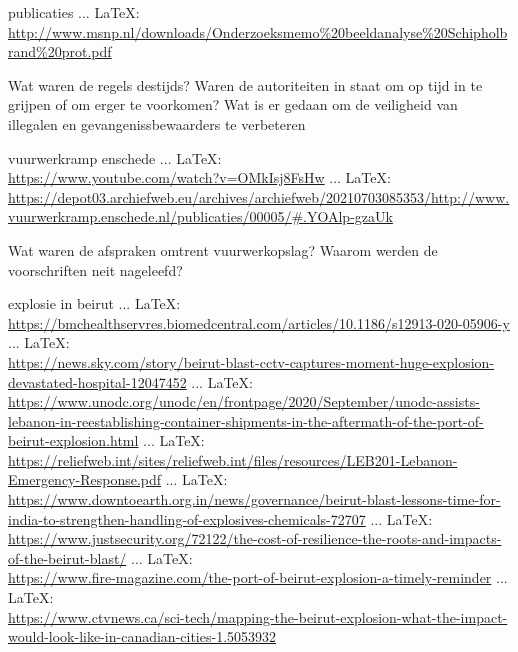 \begin{thebibliography}{99}
{{{{{{{	
	
	publicaties
	 ... \LaTeX:\\ \url{http://www.msnp.nl/downloads/Onderzoeksmemo%20beeldanalyse%20Schipholbrand%20prot.pdf}
	 
	Wat waren de regels destijds?
	Waren de autoriteiten in staat om op tijd in te grijpen of om erger te voorkomen?
	Wat is er gedaan om de veiligheid van illegalen en gevangenissbewaarders te verbeteren
	
	
	
	vuurwerkramp enschede
	 ... \LaTeX:\\ \url{https://www.youtube.com/watch?v=OMkIsj8FsHw}
	 ... \LaTeX:\\ \url{https://depot03.archiefweb.eu/archives/archiefweb/20210703085353/http://www.vuurwerkramp.enschede.nl/publicaties/00005/#.YOAlp-gzaUk}
	
	Wat waren de afspraken omtrent vuurwerkopslag?
	Waarom werden de voorschriften neit nageleefd?
	
	
	
	
	explosie in beirut
	 ... \LaTeX:\\ \url{https://bmchealthservres.biomedcentral.com/articles/10.1186/s12913-020-05906-y}
	 ... \LaTeX:\\ \url{https://news.sky.com/story/beirut-blast-cctv-captures-moment-huge-explosion-devastated-hospital-12047452}
	 ... \LaTeX:\\ \url{https://www.unodc.org/unodc/en/frontpage/2020/September/unodc-assists-lebanon-in-reestablishing-container-shipments-in-the-aftermath-of-the-port-of-beirut-explosion.html}
	 ... \LaTeX:\\ \url{https://reliefweb.int/sites/reliefweb.int/files/resources/LEB201-Lebanon-Emergency-Response.pdf}
	 ... \LaTeX:\\ \url{https://www.downtoearth.org.in/news/governance/beirut-blast-lessons-time-for-india-to-strengthen-handling-of-explosives-chemicals-72707}
	 ... \LaTeX:\\ \url{https://www.justsecurity.org/72122/the-cost-of-resilience-the-roots-and-impacts-of-the-beirut-blast/}
	 ... \LaTeX:\\ \url{https://www.fire-magazine.com/the-port-of-beirut-explosion-a-timely-reminder}
	 ... \LaTeX:\\ \url{https://www.ctvnews.ca/sci-tech/mapping-the-beirut-explosion-what-the-impact-would-look-like-in-canadian-cities-1.5053932}
	
}}}}}}}
\end{thebibliography}
